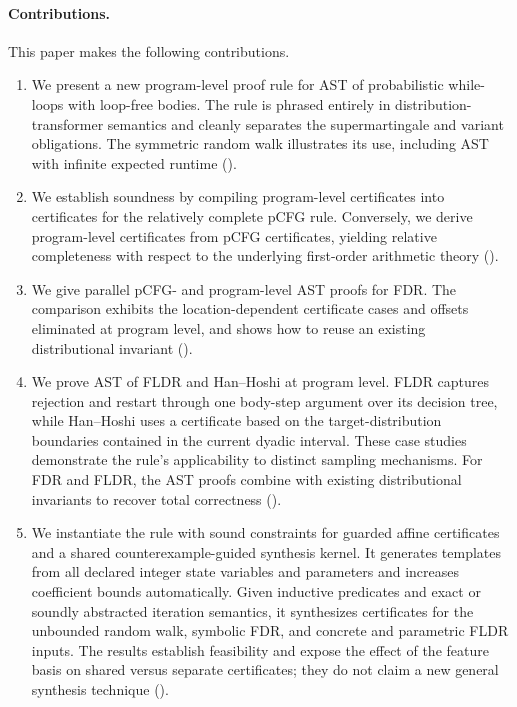 \paragraph{Contributions.}
This paper makes the following contributions.
\begin{enumerate}
 \item We present a new program-level proof rule for AST of probabilistic while-loops with loop-free bodies. The rule is phrased entirely in distribution-transformer semantics and cleanly separates the supermartingale and variant obligations. The symmetric random walk illustrates its use, including AST with infinite expected runtime ().
 \item We establish soundness by compiling program-level certificates into certificates for the relatively complete pCFG rule. Conversely, we derive program-level certificates from pCFG certificates, yielding relative completeness with respect to the underlying first-order arithmetic theory ().
 \item We give parallel pCFG- and program-level AST proofs for FDR. The comparison exhibits the location-dependent certificate cases and offsets eliminated at program level, and shows how to reuse an existing distributional invariant ().
 \item We prove AST of FLDR and Han--Hoshi at program level. FLDR captures rejection and restart through one body-step argument over its decision tree, while Han--Hoshi uses a certificate based on the target-distribution boundaries contained in the current dyadic interval. These case studies demonstrate the rule's applicability to distinct sampling mechanisms. For FDR and FLDR, the AST proofs combine with existing distributional invariants to recover total correctness ().
 \item We instantiate the rule with sound constraints for guarded affine certificates and a shared counterexample-guided synthesis kernel. It generates templates from all declared integer state variables and parameters and increases coefficient bounds automatically. Given inductive predicates and exact or soundly abstracted iteration semantics, it synthesizes certificates for the unbounded random walk, symbolic FDR, and concrete and parametric FLDR inputs. The results establish feasibility and expose the effect of the feature basis on shared versus separate certificates; they do not claim a new general synthesis technique ().
\end{enumerate}

